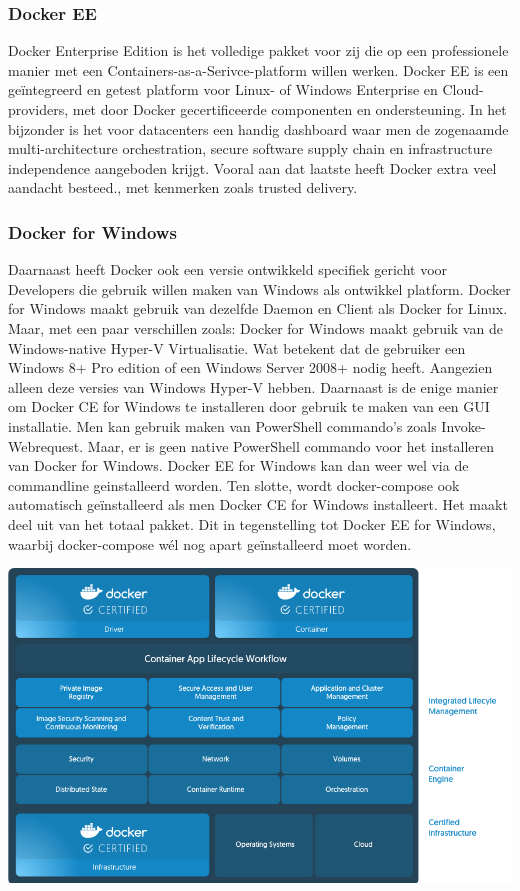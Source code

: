 \subsubsection{Docker EE}
Docker Enterprise Edition is het volledige pakket voor zij die op een professionele manier met een Containers-as-a-Serivce-platform willen werken. Docker EE is een geïntegreerd en getest platform voor Linux- of Windows Enterprise en Cloud-providers, met door Docker gecertificeerde componenten en ondersteuning. In het bijzonder is het voor datacenters een handig dashboard waar men de zogenaamde multi-architecture orchestration, secure software supply chain en infrastructure independence aangeboden krijgt. Vooral aan dat laatste heeft Docker extra veel aandacht besteed., met kenmerken zoals trusted delivery.

\subsubsection{Docker for Windows}
Daarnaast heeft Docker ook een versie ontwikkeld specifiek gericht voor Developers die gebruik willen maken van Windows als ontwikkel platform. Docker for Windows maakt gebruik van dezelfde Daemon en Client als Docker for Linux. Maar, met een paar verschillen zoals: Docker for Windows maakt gebruik van de Windows-native Hyper-V Virtualisatie. Wat betekent dat de gebruiker een Windows 8+ Pro edition of een Windows Server 2008+ nodig heeft. Aangezien alleen deze versies van Windows Hyper-V hebben. Daarnaast is de enige manier om Docker CE for Windows te installeren door gebruik te maken van een GUI installatie. Men kan gebruik maken van PowerShell commando's zoals Invoke-Webrequest. Maar, er is geen native PowerShell commando voor het installeren van Docker for Windows. Docker EE for Windows kan dan weer wel via de commandline geinstalleerd worden. Ten slotte, wordt docker-compose ook automatisch geïnstalleerd als men Docker CE for Windows installeert. Het maakt deel uit van het totaal pakket. Dit in tegenstelling tot Docker EE for Windows, waarbij docker-compose wél nog apart geïnstalleerd moet worden.

\begin{center}
	\includegraphics[scale=0.2]{img/dockerce.png}
\end{center}


